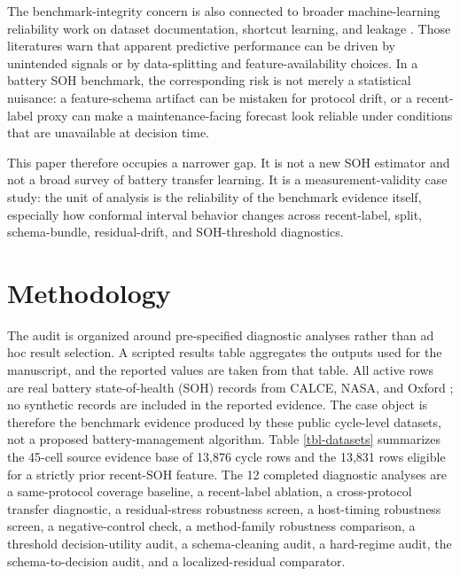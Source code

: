 \documentclass[
  number,
  preprint]{elsarticle}
\begin{document}
The benchmark-integrity concern is also connected to broader
machine-learning reliability work on dataset documentation, shortcut
learning, and leakage
\citep{gebru2021datasheets, geirhos2020shortcut, kapoor2023leakage}.
Those literatures warn that apparent predictive performance can be
driven by unintended signals or by data-splitting and
feature-availability choices. In a battery SOH benchmark, the
corresponding risk is not merely a statistical nuisance: a
feature-schema artifact can be mistaken for protocol drift, or a
recent-label proxy can make a maintenance-facing forecast look reliable
under conditions that are unavailable at decision time.

This paper therefore occupies a narrower gap. It is not a new SOH
estimator and not a broad survey of battery transfer learning. It is a
measurement-validity case study: the unit of analysis is the reliability
of the benchmark evidence itself, especially how conformal interval
behavior changes across recent-label, split, schema-bundle,
residual-drift, and SOH-threshold diagnostics.

\section{Methodology}\label{sec-methodology}

The audit is organized around pre-specified diagnostic analyses rather
than ad hoc result selection. A scripted results table aggregates the
outputs used for the manuscript, and the reported values are taken from
that table. All active rows are real battery state-of-health (SOH)
records from CALCE, NASA, and Oxford
\citep{calce_battery_data, nasa_pcoe_battery_data, howey2017oxford}; no
synthetic records are included in the reported evidence. The case object
is therefore the benchmark evidence produced by these public cycle-level
datasets, not a proposed battery-management algorithm. Table
\ref{tbl-datasets} summarizes the 45-cell source evidence base of 13,876
cycle rows and the 13,831 rows eligible for a strictly prior recent-SOH
feature. The 12 completed diagnostic analyses are a same-protocol
coverage baseline, a recent-label ablation, a cross-protocol transfer
diagnostic, a residual-stress robustness screen, a host-timing
robustness screen, a negative-control check, a method-family robustness
comparison, a threshold decision-utility audit, a schema-cleaning audit,
a hard-regime audit, the schema-to-decision audit, and a
localized-residual comparator.
\end{document}
